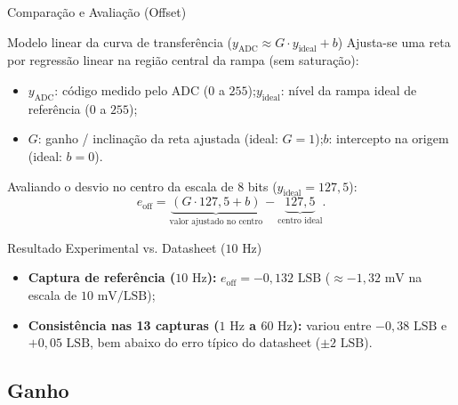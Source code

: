 \documentclass{beamer}
\begin{document}
\begin{frame}{Comparação e Avaliação (Offset)}
\begin{block}{Modelo linear da curva de transferência ($y_{\text{ADC}} \approx G\cdot y_{\text{ideal}} + b$)}
\footnotesize
Ajusta-se uma reta por regressão linear na região central da rampa (sem saturação):
\begin{itemize}
\item $y_{\text{ADC}}$: código medido pelo ADC ($0$ a $255$);\quad $y_{\text{ideal}}$: nível da rampa ideal de referência ($0$ a $255$);
\item $G$: ganho / inclinação da reta ajustada (ideal: $G = 1$);\quad $b$: intercepto na origem (ideal: $b = 0$).
\end{itemize}
\vspace{-0.1cm}
Avaliando o desvio no centro da escala de 8 bits ($y_{\text{ideal}} = 127{,}5$):
\vspace{-0.15cm}
\[
e_{\text{off}} = \underbrace{(G\cdot 127{,}5 + b)}_{\text{valor ajustado no centro}} - \underbrace{127{,}5}_{\text{centro ideal}}.
\]
\vspace{-0.2cm}
\end{block}

\begin{exampleblock}{Resultado Experimental vs. Datasheet ($10\text{ Hz}$)}
\footnotesize
\begin{itemize}
\item \textbf{Captura de referência ($10\text{ Hz}$):} $e_{\text{off}} = \boxed{-0{,}132\text{ LSB}}$ ($\approx -1{,}32\text{ mV}$ na escala de $10\text{ mV/LSB}$);
\item \textbf{Consistência nas 13 capturas ($1\text{ Hz}$ a $60\text{ Hz}$):} variou entre $-0{,}38\text{ LSB}$ e $+0{,}05\text{ LSB}$, bem abaixo do erro típico do datasheet ($\pm 2\text{ LSB}$).
\end{itemize}
\end{exampleblock}
\end{frame}

\subsection{Ganho}
\end{document}
